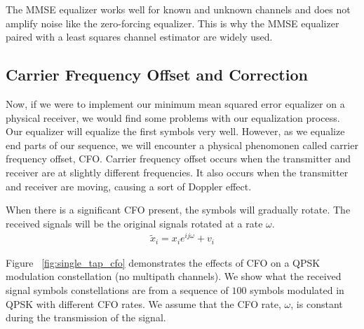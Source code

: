 The MMSE equalizer works well for known and unknown channels and does not amplify noise like the zero-forcing equalizer.  This is why the MMSE equalizer paired with a least squares channel estimator are widely used.

 
\subsection{Carrier Frequency Offset and Correction}

Now, if we were to implement our minimum mean squared error equalizer on a physical receiver, we would find some problems with our equalization process.  
Our equalizer will equalize the first symbols very well.  However, as we equalize end parts of our sequence, we will encounter a physical phenomonen called carrier frequency offset, CFO.
Carrier frequency offset occurs when the transmitter and receiver are at slightly different frequencies.  It also occurs when the transmitter and receiver are moving, causing a sort of Doppler effect. 

When there is a significant CFO present, the symbols will gradually rotate. The received signals will be the original signals rotated at a rate $\omega$.
\begin{align}
\tilde{x}_i = x_i e^{ij\omega}+v_i
\end{align} 

Figure ~\ref{fig:single_tap_cfo} demonstrates the effects of CFO on a QPSK modulation constellation (no multipath channels). 
We show what the received signal symbols constellations are from a sequence of $100$ symbols modulated in QPSK with different CFO rates.  We assume that the CFO rate, $\omega$, is constant during the transmission of the signal.

